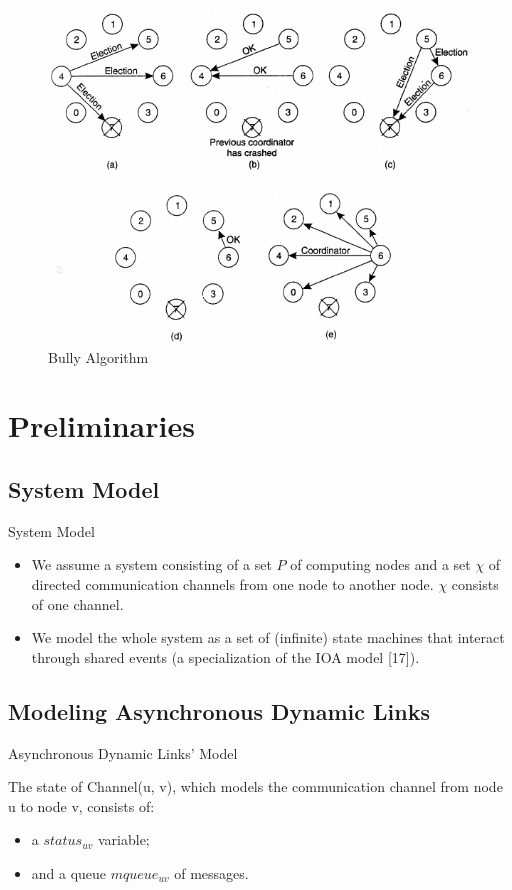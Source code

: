 \documentclass{beamer}
\begin{document}
\begin{frame}
	\begin{figure}
		\centering
		\includegraphics[width=0.7\linewidth]{bully_algorithm}
		\caption{Bully Algorithm}
		\label{fig:bullyalgorithm}
	\end{figure}
	
\end{frame}

\section{Preliminaries}
\subsection{System Model}

\begin{frame}{System Model}

\begin{itemize}
	\item We assume a system consisting of a set $P$ of computing nodes and a set $\chi$ of directed communication channels from one node to another node. $\chi$ consists of one channel.
	\item We model the whole system as a set of (infinite) state machines that interact through shared events (a specialization of the IOA model [17]).

\end{itemize}

\end{frame}


\subsection{Modeling Asynchronous Dynamic Links}
\begin{frame}{Asynchronous Dynamic Links' Model}

	The state of Channel(u, v), which models the communication channel from node u to node v, consists of:
	\begin{itemize}
		\item a $status_{uv}$ variable;
		\item and a queue $mqueue_{uv}$ of messages.
	\end{itemize}
	 

\end{frame}
\end{document}
